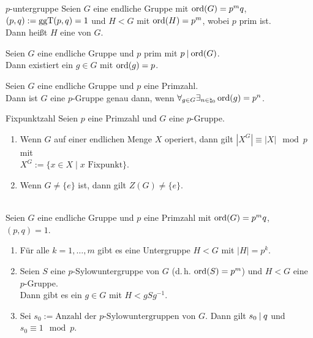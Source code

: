 \begin{Def}{$p$-untergruppe}
    Seien $G$ eine endliche Gruppe mit $\operatorname{ord}(G) = p^m q$,\\
    $(p, q) := \operatorname{ggT}(p, q) = 1$
    und $H < G$ mit $\operatorname{ord}(H) = p^m$, wobei $p$ prim ist.\\
    Dann heißt $H$ eine  von $G$.
\end{Def}

\begin{Theorem}{}
    Seien $G$ eine endliche Gruppe und $p$ prim mit $p \mathbin{|} \operatorname{ord}(G)$.\\
    Dann existiert ein $g \in G$ mit $\operatorname{ord}(g) = p$.
\end{Theorem}

\begin{Kor}
    Seien $G$ eine endliche Gruppe und $p$ eine Primzahl.\\
    Dann ist $G$ eine $p$-Gruppe genau dann, wenn
    $\forall_{g \in G} \exists_{n \in \natural_0} \operatorname{ord}(g) = p^n$.
\end{Kor}

\linie

\begin{Prop}{Fixpunktzahl}
    Seien $p$ eine Primzahl und $G$ eine $p$-Gruppe.
    \begin{enumerate}[label=(\alph*)]
        \item
        Wenn $G$ auf einer endlichen Menge $X$ operiert, dann gilt
        $|X^G| \equiv |X| \mod p$ mit\\
        $X^G := \{x \in X \;|\; x \text{ Fixpunkt}\}$.
        
        \item
        Wenn $G \not= \{e\}$ ist, dann gilt $Z(G) \not= \{e\}$.
    \end{enumerate}
\end{Prop}

\linie

\begin{Theorem}{}\\
    Seien $G$ eine endliche Gruppe und $p$ eine Primzahl mit
    $\operatorname{ord}(G) = p^m q$, $(p, q) = 1$.
    \begin{enumerate}[label=(\alph*)]
        \item
        Für alle $k = 1, \dotsc, m$ gibt es eine Untergruppe $H < G$
        mit $|H| = p^k$.
        
        \item
        Seien $S$ eine $p$-Sylowuntergruppe von $G$ (d.\,h. $\operatorname{ord}(S) = p^m$)
        und $H < G$ eine $p$-Gruppe.\\
        Dann gibt es ein $g \in G$ mit $H < gSg^{-1}$.
        
        \item
        Sei $s_0 := \text{Anzahl der } p\text{-Sylowuntergruppen von } G$.
        Dann gilt $s_0 \mathbin{|} q$ und $s_0 \equiv 1 \mod p$.
    \end{enumerate}
\end{Theorem}

